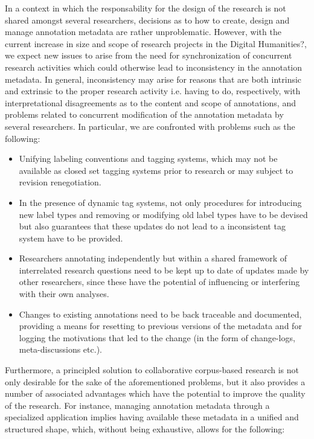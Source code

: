 \documentclass{sig-alternate}
\begin{document}
In a context in which the responsability for the design of the research is not shared
amongst several researchers, decisions as to how to create, design and manage annotation metadata are rather
unproblematic. However, with the current increase in size and scope of research projects in
the Digital Humanities?, we expect new issues to arise from the need for synchronization of
concurrent research activities which could otherwise lead to inconsistency in the annotation
metadata. In general, inconsistency may arise for reasons that are both intrinsic and
extrinsic to the proper research activity \textemdash i.e. having to do, respectively,
with interpretational disagreements as to the content and scope of annotations, and
problems related to concurrent modification of the annotation metadata by several researchers.
In particular, we are confronted with problems such as the following:
\begin{itemize}
\item Unifying labeling conventions and tagging systems, which may not be available as closed
  set tagging systems prior to research or may subject to revision renegotiation.
\item In the presence of dynamic tag systems, not only procedures for introducing
  new label types and removing or modifying old label types have to be devised but also
  guarantees that these updates do not lead to a inconsistent tag system have to be provided.
\item Researchers annotating independently but within a shared framework of interrelated
  research questions need to be kept up to date of updates made by other researchers, since
  these have the potential of influencing or interfering with their own analyses.
\item Changes to existing annotations need to be back traceable and documented, providing
  a means for resetting to previous versions of the metadata and for logging the motivations
  that led to the change (in the form of change-logs, meta-discussions etc.).
\end{itemize}

Furthermore, a principled solution to collaborative corpus-based research is not only
desirable for the sake of the aforementioned problems, but it also provides a number of
associated advantages which have the potential to improve the quality of the research.
For instance, managing annotation metadata through a specialized application implies
having available these metadata in a unified and structured shape, which, without being
exhaustive, allows for the following:
\end{document}

